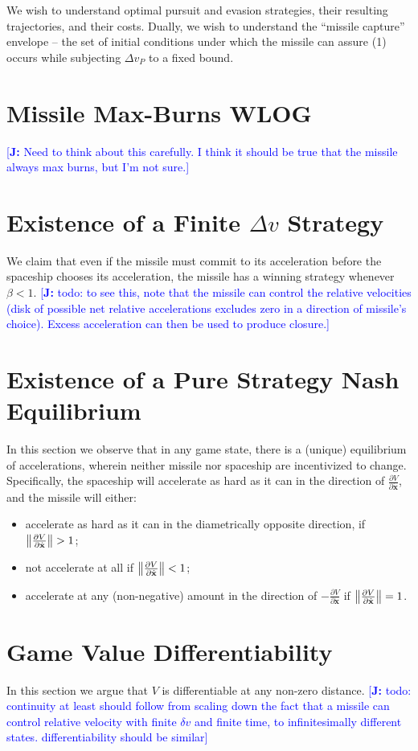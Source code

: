 \documentclass{article}
\newcommand{\authnote}[3]{\textcolor{#3}{[{\footnotesize {\bf #1:} { {#2}}}]}}
\newcommand{\jnote}[1]{\authnote{J}{#1}{blue} }
\renewcommand{\vec}[1]{\mathbf{#1}}
\begin{document}
We wish to understand optimal pursuit and evasion strategies, their resulting
trajectories, and their costs.  Dually, we wish to understand the ``missile
capture'' envelope -- the set of initial conditions under which the missile can
assure (1) occurs while subjecting $\Delta v_P$ to a fixed bound.
\section{Missile Max-Burns WLOG}
\jnote{Need to think about this carefully.  I think it should be true that the
  missile always max burns, but I'm not sure.}

\section{Existence of a Finite $\Delta v$ Strategy}
We claim that even if the missile must commit to its acceleration before the
spaceship chooses its acceleration, the missile has a winning strategy whenever
$\beta < 1$.  \jnote{todo: to see this, note that the missile can control the
  relative velocities (disk of possible net relative accelerations excludes zero
  in a direction of missile's choice).  Excess acceleration can then be used to
  produce closure.}

\section{Existence of a Pure Strategy Nash Equilibrium}
In this section we observe that in any game state, there is a (unique) equilibrium
of accelerations, wherein neither missile nor spaceship are incentivized to
change.  Specifically, the spaceship will accelerate as hard as it can in the
direction of $\frac{\partial V}{\partial \dot{\vec{x}}}$, and the missile will
either:
\begin{itemize}
\item
accelerate as hard as it can in the diametrically opposite direction, if
$\norm{\frac{\partial V}{\partial \dot{\vec{x}}}} > 1$;
\item not accelerate at all if $\norm{\frac{\partial V}{\partial \dot{\vec{x}}}}
  < 1$;
\item accelerate at any (non-negative) amount in the direction of
  $-\frac{\partial V}{\partial \dot{\vec{x}}}$ if
  $\norm{\frac{\partial V}{\partial \dot{\vec{x}}}} = 1$.
\end{itemize}

\section{Game Value Differentiability}
In this section we argue that $V$ is differentiable at any non-zero distance.
\jnote{todo: continuity at least  should follow from scaling down the fact that a missile can
  control relative velocity with finite $\delta v$ and finite time, to
  infinitesimally different states.  differentiability should be similar}
\end{document}
